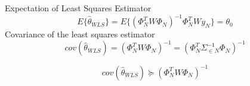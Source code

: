 \begin{tcolorbox}[colback=red!5!white,colframe=red!75!black,title=\textbf{Statistical Analysis of WLS}]
Expectation of Least Squares Estimator
\begin{equation*}
{ E }\{ { \hat { \theta  } _{ WLS } }\} { ={ E }\{ ({ \Phi  }_{ N }^{ T }W{ \Phi  }_{ N }) }^{ -1 }{ \Phi  }_{ N }^{ T }W{ y }_{ N }\} ={\theta}_{0}
\end{equation*}
Covariance of the least squares estimator
\begin{equation*}
cov({ \hat { \theta  } _{ WLS } }){ =({ \Phi  }_{ N }^{ T }W{ \Phi  }_{ N }) }^{ -1 }{ =({ \Phi  }_{ N }^{ T }{\Sigma}_{\in N }^{ -1 }{ \Phi  }_{ N }) }^{ -1 }
\end{equation*}

\begin{equation*}
cov({ \hat { \theta  } _{ WLS } }){ \succeq ({ \Phi  }_{ N }^{ T }W{ \Phi  }_{ N }) }^{ -1 }
\end{equation*}
\end{tcolorbox}

